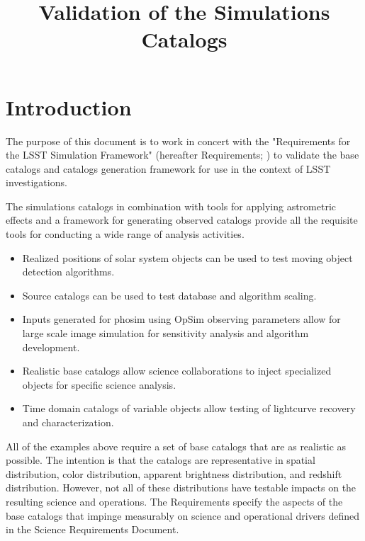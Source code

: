 \documentclass[]{article}
\begin{document}
 
\sloppy
\title
{Validation of the Simulations Catalogs}


\label{firstpage}


\maketitle 
\section{Introduction \label{sec:intro}}
The purpose of this document is to work in concert with the "Requirements for the 
LSST Simulation Framework" (hereafter Requirements; \cite{requirements}) to validate the
base catalogs and catalogs generation framework for use in the context of
LSST investigations. 

The simulations catalogs in combination with tools for applying astrometric effects and a 
framework for generating observed catalogs provide all the requisite tools for conducting a 
wide range of analysis activities.
\begin{itemize}
\item Realized positions of solar system objects can be used to test moving object detection algorithms.
\item Source catalogs can be used to test database and algorithm scaling.
\item Inputs generated for phosim using OpSim observing parameters allow for large scale image simulation
for sensitivity analysis and algorithm development.
\item Realistic base catalogs allow science collaborations to inject specialized objects for specific science
analysis.
\item Time domain catalogs of variable objects allow testing of lightcurve recovery and characterization.
\end{itemize}

All of the examples above require a set of base catalogs that are as realistic as possible.  The intention
is that the catalogs are representative in spatial distribution, color distribution, apparent
brightness distribution, and redshift distribution.  However, not all of these distributions have testable impacts
on the resulting science and operations.
The Requirements specify the aspects of the base catalogs that impinge measurably on science and 
operational drivers defined in the Science Requirements Document.
\end{document}

